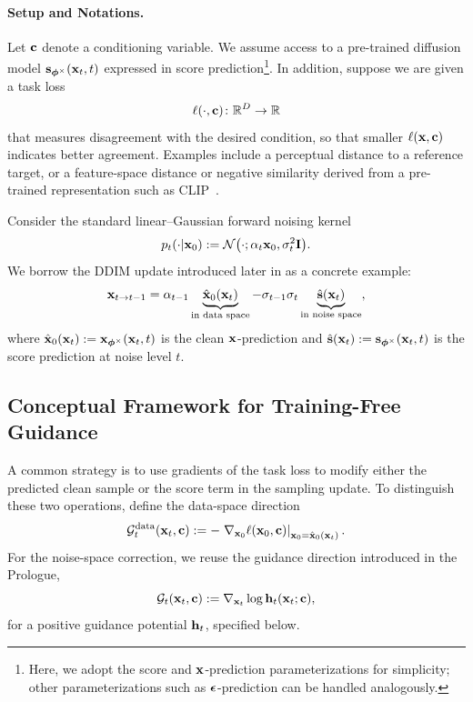 \paragraph{Setup and Notations.}
Let ${\mathbf{c}}$ denote a conditioning variable. We assume access to a pre-trained
diffusion model ${\mathbf{s}}_{\bm{\phi}^\times}({\mathbf{x}}_t,t)$ expressed in score
prediction\footnote{Here, we adopt the score and ${\mathbf{x}}$-prediction
parameterizations for simplicity; other parameterizations such as
${\bm{\epsilon}}$-prediction can be handled analogously.}. In addition, suppose we are
given a task loss
\[
\ell(\cdot,{\mathbf{c}})\colon\mathbb{R}^D\to\mathbb{R}
\]
that measures disagreement with the desired condition, so that smaller
$\ell({\mathbf{x}},{\mathbf{c}})$ indicates better agreement. Examples include a perceptual
distance to a reference target, or a feature-space distance or negative
similarity derived from a pre-trained representation such as
CLIP~\citep{radford2021learning}.

Consider the standard linear--Gaussian forward noising kernel
\[
p_t(\cdot|{\mathbf{x}}_0)
:=
\mathcal N\bigl(\cdot;\alpha_t{\mathbf{x}}_0,\sigma_t^2{\mathbf{I}}\bigr).
\]
We borrow the DDIM update introduced later in  as a
concrete example:
\begin{align}\label{eq:ddim-update-clean-noise-score}
{\mathbf{x}}_{t\rightarrow t-1}
=
\alpha_{t-1}
\underbrace{\hat{{\mathbf{x}}}_0({\mathbf{x}}_t)}_{\text{in data space}}
-
\sigma_{t-1}\sigma_t
\underbrace{\hat{{\mathbf{s}}}({\mathbf{x}}_t)}_{\text{in noise space}},
\end{align}
where
$\hat{{\mathbf{x}}}_0({\mathbf{x}}_t):={\mathbf{x}}_{\bm{\phi}^\times}({\mathbf{x}}_t,t)$ is the clean
${\mathbf{x}}$-prediction and
$\hat{{\mathbf{s}}}({\mathbf{x}}_t):={\mathbf{s}}_{\bm{\phi}^\times}({\mathbf{x}}_t,t)$ is the score
prediction at noise level $t$.


\subsection{Conceptual Framework for Training-Free Guidance}\label{subsec:tfg}

A common strategy is to use gradients of the task loss to modify either the
predicted clean sample or the score term in the sampling update. To distinguish
these two operations, define the data-space direction
\[
\mathcal G_t^{\mathrm{data}}({\mathbf{x}}_t,{\mathbf{c}})
:=
-
\left.
\nabla_{{\mathbf{x}}_0}\ell({\mathbf{x}}_0,{\mathbf{c}})
\right|_{{\mathbf{x}}_0=\hat{{\mathbf{x}}}_0({\mathbf{x}}_t)}.
\]
For the noise-space correction, we reuse the guidance direction introduced in
the Prologue,
\[
\mathcal G_t({\mathbf{x}}_t,{\mathbf{c}})
:=
\nabla_{{\mathbf{x}}_t}\log{\mathbf{h}}_t({\mathbf{x}}_t;{\mathbf{c}}),
\]
for a positive guidance potential ${\mathbf{h}}_t$, specified below.

